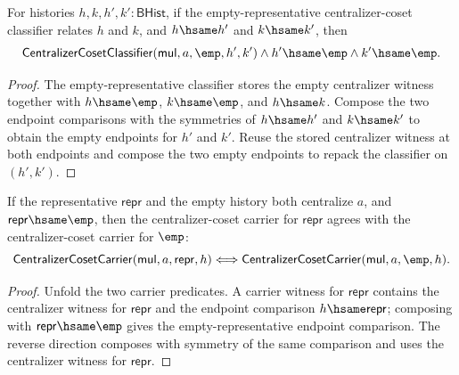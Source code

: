 \begin{theorem}
\label{thm:quotientgroup-centralizer-coset-classifier-empty-hsame-endpoint-transport}
For histories $h,k,h',k':\mathsf{BHist}$, if the empty-representative
centralizer-coset classifier relates $h$ and $k$, and $h\hsame h'$ and
$k\hsame k'$, then
$$
\mathsf{CentralizerCosetClassifier}(\mathsf{mul},a,\emp,h',k')
\land h'\hsame\emp\land k'\hsame\emp.
$$
\end{theorem}
\begin{proof}
The empty-representative classifier stores the empty centralizer witness
together with $h\hsame\emp$, $k\hsame\emp$, and $h\hsame k$. Compose the two
endpoint comparisons with the symmetries of $h\hsame h'$ and $k\hsame k'$ to
obtain the empty endpoints for $h'$ and $k'$. Reuse the stored centralizer
witness at both endpoints and compose the two empty endpoints to repack the
classifier on $(h',k')$.
\end{proof}

\begin{theorem}
\label{thm:quotientgroup-centralizer-coset-carrier-empty-representative-transport}
If the representative $\mathsf{repr}$ and the empty history both centralize
$a$, and $\mathsf{repr}\hsame\emp$, then the centralizer-coset carrier for
$\mathsf{repr}$ agrees with the centralizer-coset carrier for $\emp$:
$$
\mathsf{CentralizerCosetCarrier}(\mathsf{mul},a,\mathsf{repr},h)
\Longleftrightarrow
\mathsf{CentralizerCosetCarrier}(\mathsf{mul},a,\emp,h).
$$
\end{theorem}
\begin{proof}
Unfold the two carrier predicates. A carrier witness for $\mathsf{repr}$
contains the centralizer witness for $\mathsf{repr}$ and the endpoint
comparison $h\hsame\mathsf{repr}$; composing with
$\mathsf{repr}\hsame\emp$ gives the empty-representative endpoint comparison.
The reverse direction composes with symmetry of the same comparison and uses
the centralizer witness for $\mathsf{repr}$.
\end{proof}

